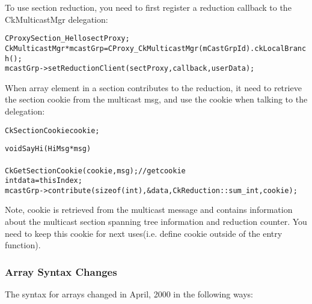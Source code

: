 To use section reduction, you need to first register a reduction callback to
the CkMulticastMgr delegation:

\begin{alltt}
  CProxySection_Hello sectProxy;
  CkMulticastMgr *mcastGrp = CProxy_CkMulticastMgr(mCastGrpId).ckLocalBranch();
  mcastGrp->setReductionClient(sectProxy, callback, userData);
\end{alltt}

When array element in a section contributes to the reduction, it need to 
retrieve the section cookie from the multicast msg, and use the cookie when
talking to the delegation:

\begin{alltt}
  CkSectionCookie cookie;

  void SayHi(HiMsg *msg)
  {
    CkGetSectionCookie(cookie, msg);     // get cookie
    int data = thisIndex;
    mcastGrp->contribute(sizeof(int), &data, CkReduction::sum_int, cookie);
  }
\end{alltt}

Note, cookie is retrieved from the multicast message and contains information
about the multicast section spanning tree information and reduction counter.
You need to keep this cookie for next uses(i.e. define cookie outside of the 
entry function).

\subsubsection{Array Syntax Changes}

The syntax for arrays changed in April, 2000 in the following ways:

